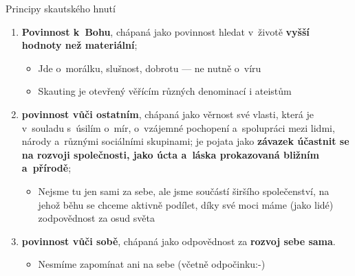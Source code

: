 \documentclass[compress, ucs, xelatex, xcolor=dvipsnames, print,
  hyperref={
    bookmarks=true,
    unicode=true,
    colorlinks=true,
    plainpages=false,
    pdfkeywords={Junak, Pedagogika, Skaut, Skauting, Vychovna metoda},
    linkcolor=Black,
    anchorcolor=Black,
    citecolor=OliveGreen,
    filecolor=OliveGreen,
    menucolor=Black,
    urlcolor=OliveGreen,
    pdftex}
  ]{beamer}
\begin{document}
\begin{frame}{Principy skautského hnutí}
  \begin{enumerate}
    \item \textbf{Povinnost k~Bohu}, chápaná jako povinnost hledat v~životě \textbf{vyšší hodnoty než materiální};
    \begin{itemize}
      \item Jde o~morálku, slušnost, dobrotu --- ne nutně o~víru
      \item Skauting je otevřený věřícím různých denominací i ateistům
    \end{itemize}
    \item \textbf{povinnost vůči ostatním}, chápaná jako věrnost své vlasti, která je v~souladu s~úsilím o~mír, o~vzájemné pochopení a~spolupráci mezi lidmi, národy a~různými sociálními skupinami; je pojata jako \textbf{závazek účastnit se na rozvoji společnosti, jako úcta a~láska prokazovaná bližním a~přírodě};
    \begin{itemize}
      \item Nejsme tu jen sami za sebe, ale jsme součástí širšího společenství, na jehož běhu se chceme aktivně podílet, díky své moci máme (jako lidé) zodpovědnost za osud světa
    \end{itemize}
    \item \textbf{povinnost vůči sobě}, chápaná jako odpovědnost za \textbf{rozvoj sebe sama}.
    \begin{itemize}
      \item Nesmíme zapomínat ani na sebe (včetně odpočinku:-)
    \end{itemize}
  \end{enumerate}
\end{frame}
\end{document}
